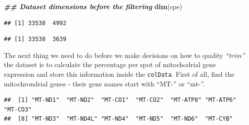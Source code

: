 \documentclass[
]{book}
\newenvironment{Shaded}{\begin{snugshade}}{\end{snugshade}}
\newcommand{\DecValTok}[1]{\textcolor[rgb]{0.00,0.00,0.81}{#1}}
\newcommand{\DocumentationTok}[1]{\textcolor[rgb]{0.56,0.35,0.01}{\textbf{\textit{#1}}}}
\newcommand{\FunctionTok}[1]{\textcolor[rgb]{0.13,0.29,0.53}{\textbf{#1}}}
\newcommand{\NormalTok}[1]{#1}
\newcommand{\OtherTok}[1]{\textcolor[rgb]{0.56,0.35,0.01}{#1}}
\newcommand{\SpecialCharTok}[1]{\textcolor[rgb]{0.81,0.36,0.00}{\textbf{#1}}}
\newcommand{\StringTok}[1]{\textcolor[rgb]{0.31,0.60,0.02}{#1}}
\begin{document}
\begin{Shaded}
\begin{Highlighting}[]
\DocumentationTok{\#\# Dataset dimensions before the filtering}
\FunctionTok{dim}\NormalTok{(spe)}
\end{Highlighting}
\end{Shaded}

\begin{verbatim}
## [1] 33538  4992
\end{verbatim}

\begin{Shaded}
\end{Shaded}

\begin{verbatim}
## [1] 33538  3639
\end{verbatim}

The next thing we need to do before we make decisions on how to quality \emph{``trim''} the dataset is to calculate the percentage per spot of mitochodrial gene expression and store this information inside the \texttt{colData}. First of all, find the mitochrondrial genes - their gene names start with ``MT-'' or ``mt-''.

\begin{Shaded}
\end{Shaded}

\begin{verbatim}
##  [1] "MT-ND1"  "MT-ND2"  "MT-CO1"  "MT-CO2"  "MT-ATP8" "MT-ATP6" "MT-CO3" 
##  [8] "MT-ND3"  "MT-ND4L" "MT-ND4"  "MT-ND5"  "MT-ND6"  "MT-CYB"
\end{verbatim}
\end{document}
